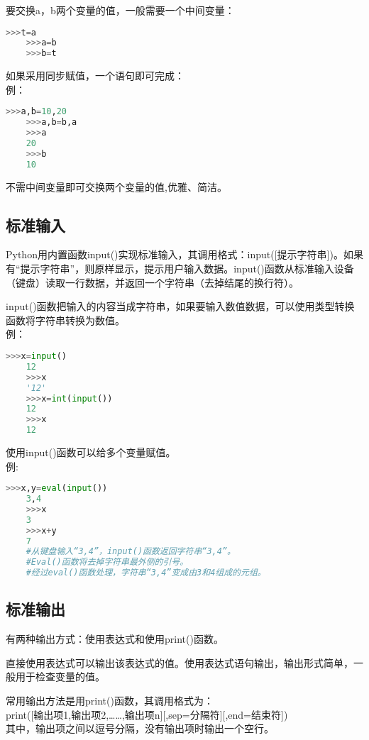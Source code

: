 \documentclass[11pt,a4paper]{article}
\begin{document}
要交换a，b两个变量的值，一般需要一个中间变量：
\begin{lstlisting}[language={Python}]
    >>>t=a
    >>>a=b
    >>>b=t
\end{lstlisting}

如果采用同步赋值，一个语句即可完成：\\
例：
\begin{lstlisting}[language={Python}]
    >>>a,b=10,20
    >>>a,b=b,a
    >>>a
    20
    >>>b
    10
\end{lstlisting}
不需中间变量即可交换两个变量的值,优雅、简洁。

\subsection{标准输入}

Python用内置函数input()实现标准输入，其调用格式：input([提示字符串])。如果有“提示字符串”，则原样显示，提示用户输入数据。input()函数从标准输入设备（键盘）读取一行数据，并返回一个字符串（去掉结尾的换行符）。

input()函数把输入的内容当成字符串，如果要输入数值数据，可以使用类型转换函数将字符串转换为数值。\\
例：
\begin{lstlisting}[language={Python}]
    >>>x=input()
    12
    >>>x
    '12'
    >>>x=int(input())
    12
    >>>x
    12
\end{lstlisting}

使用input()函数可以给多个变量赋值。\\
例:
\begin{lstlisting}[language={Python}]
    >>>x,y=eval(input())
    3,4
    >>>x
    3
    >>>x+y
    7
    #从键盘输入“3,4”，input()函数返回字符串“3,4”。
    #Eval()函数将去掉字符串最外侧的引号。
    #经过eval()函数处理，字符串“3,4”变成由3和4组成的元组。
\end{lstlisting}

\subsection{标准输出}

有两种输出方式：使用表达式和使用print()函数。

直接使用表达式可以输出该表达式的值。使用表达式语句输出，输出形式简单，一般用于检查变量的值。

常用输出方法是用print()函数，其调用格式为：\\
print([输出项1,输出项2,……,输出项n][,sep=分隔符][,end=结束符])\\
其中，输出项之间以逗号分隔，没有输出项时输出一个空行。
\end{document}
